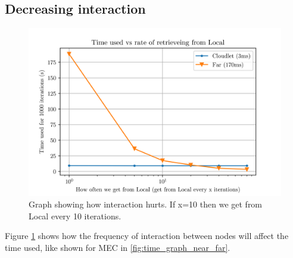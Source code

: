 \subsection{Decreasing interaction}
\begin{figure}[t]
    \centering
    \includegraphics[scale=1]{chapters/evaluation/figures/Cloudlet_latency.png}
    \caption{Graph showing how interaction hurts. If x=10 then we get from Local every 10 iterations.}
    \label{fig:Cloudlet_latency_near_far_comparison}
\end{figure}
Figure \ref{fig:Cloudlet_latency_near_far_comparison} shows how the frequency of interaction between nodes will affect the time used, like shown for MEC in \ref{fig:time_graph_near_far}. 


